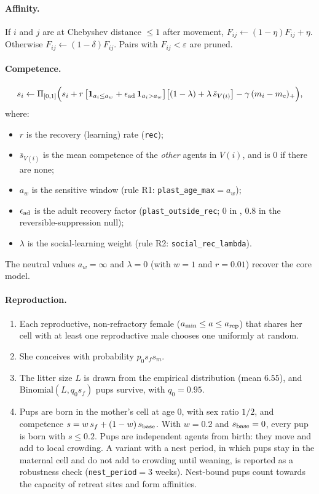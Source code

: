 \documentclass[preprint,12pt,authoryear]{elsarticle}
\begin{document}
\paragraph{Affinity.}
If $i$ and $j$ are at Chebyshev distance $\le1$ after movement, $F_{ij}\leftarrow(1-\eta)F_{ij}+\eta$.
Otherwise $F_{ij}\leftarrow(1-\delta)F_{ij}$.
Pairs with $F_{ij}<\varepsilon$ are pruned.

\paragraph{Competence.}
\[
s_i\leftarrow\Pi_{[0,1]}\Bigl(s_i+r\,\bigl[\mathbf 1_{a_i\le a_w}+\epsilon_{\rm ad}\,\mathbf 1_{a_i>a_w}\bigr]
\bigl[(1-\lambda)+\lambda\,\bar s_{V(i)}\bigr]-\gamma\,(m_i-m_c)_+\Bigr),
\]
where:
\begin{itemize}
\item $r$ is the recovery (learning) rate (\texttt{rec});
\item $\bar s_{V(i)}$ is the mean competence of the \emph{other} agents in $V(i)$, and is $0$ if there are none;
\item $a_w$ is the sensitive window (rule R1: \texttt{plast\_age\_max}${}=a_w$);
\item $\epsilon_{\rm ad}$ is the adult recovery factor (\texttt{plast\_outside\_rec}; 0 in \Cone, 0.8 in the
  reversible-suppression null);
\item $\lambda$ is the social-learning weight (rule R2: \texttt{social\_rec\_lambda}).
\end{itemize}
The neutral values $a_w=\infty$ and $\lambda=0$ (with $w=1$ and $r=0.01$) recover the core model.

\paragraph{Reproduction.}
\begin{enumerate}
\item Each reproductive, non-refractory female ($a_{\min}\le a\le a_{\rm rep}$) that shares her cell with at least one
  reproductive male chooses one uniformly at random.
\item She conceives with probability $p_0 s_f s_m$.
\item The litter size $L$ is drawn from the empirical distribution (mean $6.55$), and Binomial$(L,q_0 s_f)$ pups
  survive, with $q_0=0.95$.
\item Pups are born in the mother's cell at age $0$, with sex ratio $1/2$, and competence
  $s=w\,s_f+(1-w)\,s_{\rm base}$. With $w=0.2$ and $s_{\rm base}=0$, every pup is born with $s\le0.2$. Pups are
  independent agents from birth: they move and add to local crowding. A variant with a nest period, in which pups stay
  in the maternal cell and do not add to crowding until weaning, is reported as a robustness check (\texttt{nest\_period}${}=3$
  weeks). Nest-bound pups count towards the capacity of retreat sites and form affinities.
\end{enumerate}
\end{document}

